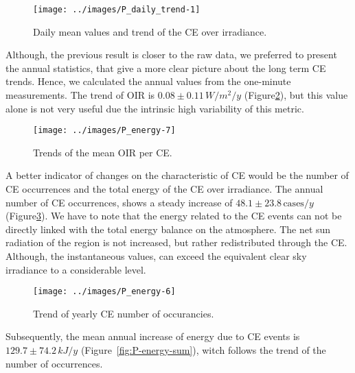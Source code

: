 \documentclass[preprint, 3p,
authoryear]{elsarticle} %
\begin{document}
\begin{figure}

{\centering \texttt{[image: ../images/P\_daily\_trend-1]} 

}

\caption{Daily mean values and trend of the CE over irradiance.}\label{fig:CEmeanDaily}
\end{figure}

Although, the previous result is closer to the raw data, we preferred to
present the annual statistics, that give a more clear picture about the
long term CE trends. Hence, we calculated the annual values from the
one-minute measurements. The trend of OIR is \(0.08\pm 0.11\,W/m^2/y\)
(Figure\nobreakspace{}\ref{fig:P-energy-mean}), but this value alone is
not very useful due the intrinsic high variability of this metric.

\begin{figure}

{\centering \texttt{[image: ../images/P\_energy-7]} 

}

\caption{Trends of the mean OIR per CE.}\label{fig:P-energy-mean}
\end{figure}

A better indicator of changes on the characteristic of CE would be the
number of CE occurrences and the total energy of the CE over irradiance.
The annual number of CE occurrences, shows a steady increase of
\(48.1\pm 23.8\,\text{cases}/y\)
(Figure\nobreakspace{}\ref{fig:P-energy-N}). We have to note that the
energy related to the CE events can not be directly linked with the
total energy balance on the atmosphere. The net sun radiation of the
region is not increased, but rather redistributed through the CE.
Although, the instantaneous values, can exceed the equivalent clear sky
irradiance to a considerable level.

\begin{figure}

{\centering \texttt{[image: ../images/P\_energy-6]} 

}

\caption{Trend of yearly CE number of occurancies.}\label{fig:P-energy-N}
\end{figure}

Subsequently, the mean annual increase of energy due to CE events is
\(129.7\pm 74.2\,kJ/y\) (Figure~\ref{fig:P-energy-sum}), witch follows
the trend of the number of occurrences.
\end{document}
